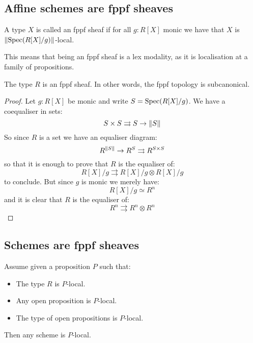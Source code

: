 \label{fppf-sheaves}

\subsection{Affine schemes are fppf sheaves}

\begin{definition}
A type $X$ is called an fppf sheaf if for all $g:R[X]$ monic we have that $X$ is $\lVert \operatorname{Spec}(R[X]/g) \rVert$-local.
\end{definition}

This means that being an fppf sheaf is a lex modality, as it is localisation at a family of propositions.

\begin{lemma}\label{fppf-subcanonical}
The type $R$ is an fppf sheaf. In other words, the fppf topology is subcanonical.
\end{lemma}

\begin{proof}
Let $g:R[X]$ be monic and write $S=\operatorname{Spec}(R[X]/g)$. We have a coequaliser in sets:
\[S\times S\rightrightarrows S \to \lVert S \rVert\]
So since $R$ is a set we have an equaliser diagram:
\[R^{\lVert S \rVert} \to R^S\rightrightarrows R^{S\times S}\]
so that it is enough to prove that $R$ is the equaliser of:
\[R[X]/g \rightrightarrows R[X]/g \otimes R[X]/g\]
to conclude. But since $g$ is monic we merely have:
\[R[X]/g \simeq R^n\]
and it is clear that $R$ is the equaliser of:
\[R^n \rightrightarrows R^n\otimes R^n\]
\end{proof}



\subsection{Schemes are fppf sheaves}

\begin{lemma}\label{scheme-are-sheaf-from-affine}
Assume given a proposition $P$ such that:
\begin{itemize}
\item The type $R$ is $P$-local.
\item Any open proposition is $P$-local.
\item The type of open propositions is $P$-local.
\end{itemize}
Then any scheme is $P$-local.
\end{lemma}

